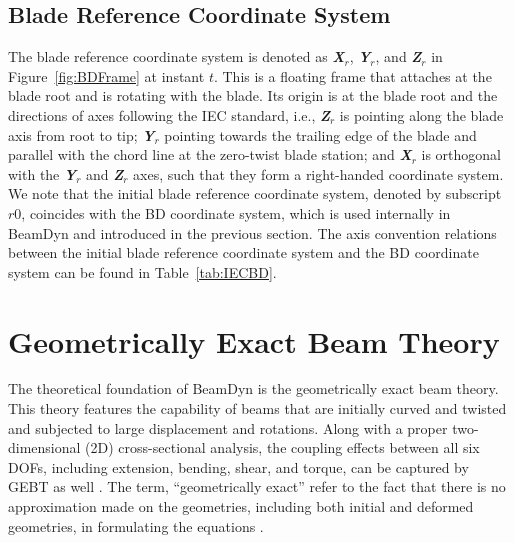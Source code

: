 \subsection{Blade Reference Coordinate System}
The blade reference coordinate system is denoted as \textbf{ {\it X$_r$}}, \textbf{ {\it Y$_r$}}, and \textbf{ {\it Z$_r$}} in Figure~\ref{fig:BDFrame} at instant $t$. 
This is a floating frame that attaches at the blade root and is rotating with the blade. 
Its origin is at the blade root and the directions of axes following the IEC standard, i.e., \textbf{ {\it Z$_r$}} is pointing along the blade axis from root to tip; \textbf{ {\it Y$_r$}} pointing towards the trailing edge of the blade and parallel with the chord line at the zero-twist blade station; and \textbf{ {\it X$_r$}} is orthogonal with the \textbf{ {\it Y$_r$}} and \textbf{ {\it Z$_r$}} axes, such that they form a right-handed coordinate system. 
We note that the initial blade reference coordinate system, denoted by subscript $r0$, coincides with the BD coordinate system, which is used internally in BeamDyn and introduced in the previous section. 
The axis convention relations between the initial blade reference coordinate system and the BD coordinate system can be found in Table~\ref{tab:IECBD}. 

\section{Geometrically Exact Beam Theory}
The theoretical foundation of BeamDyn is the geometrically exact beam theory. 
This theory features the capability of beams that are initially curved and twisted and subjected to large displacement and rotations. 
Along with a proper two-dimensional (2D) cross-sectional analysis, the coupling effects between all six DOFs, including extension, bending, shear, and torque, can be captured by GEBT as well . 
The term, ``geometrically exact'' refer to the fact that there is no approximation made on the geometries, including both initial and deformed geometries, in formulating the equations \cite{HodgesBeamBook}.    

